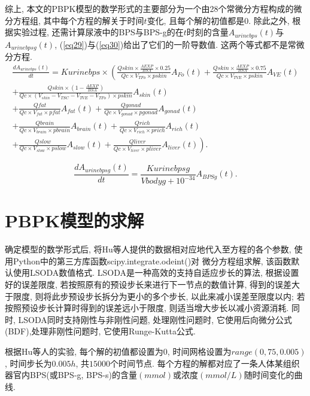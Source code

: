 \documentclass[a4paper,punct=banjiao,twoside]{ctexrep}
\theoremstyle{plain}
\theoremstyle{definition}
\theoremstyle{remark}
\begin{document}
综上, 本文的PBPK模型的数学形式的主要部分为一个由28个常微分方程构成的微分方程组, 其中每个方程的解关于时间$t$变化, 且每个解的初值都是0.
除此之外, 根据实验过程, 还需计算尿液中的BPS与BPS-g的在$t$时刻的含量$A_{urinebps}(t)$与$A_{urinebpsg}(t)$, (\ref{eq29})与(\ref{eq30})给出了它们的一阶导数值.
这两个等式都不是常微分方程.
\begin{multline}\label{eq29}
  \frac{dA_{urinebps}(t)}{dt}=Kurinebps\times \left(\frac{  Qskin \times  \frac{AEXP}{BSA} \times  0.25}{Qc \times  V_{TFo}  \times  pskin} A_{Fo}(t)
  +\frac{  Qskin \times  \frac{AEXP}{BSA} \times  0.75}{Qc \times  V_{TVE}  \times  pskin} A_{VE}(t)\right.\\
  \left.+\frac{  Qskin \times  (1-\frac{AEXP}{BSA})}{Qc \times  (V_{skin}-V_{TSC}-V_{TVE}-V_{TFo}) \times  pskin} A_{skin}(t)\right.\\
  \left.+\frac{  Qfat}{Qc \times  V_{fat}  \times  pfat} A_{fat}(t)
  +\frac{  Qgonad}{Qc \times  V_{gonad}  \times  pgonad} A_{gonad}(t)\right.\\
  \left.+\frac{  Qbrain}{Qc \times  V_{brain} \times  pbrain} A_{brain}(t)
  +\frac{  Qrich}{Qc \times  V_{rich}  \times  prich} A_{rich}(t)\right.\\
  \left.+\frac{  Qslow}{Qc \times  V_{slow}  \times  pslow} A_{slow}(t)
  +\frac{  Qliver}{Qc \times  V_{liver} \times  pliver} A_{liver}(t)\right).
\end{multline}

\begin{equation}\label{eq30}
  \frac{dA_{urinebpsg}(t)}{dt}=\frac{Kurinebpsg}{Vbodyg+10^{-34} } A_{BPSg}(t).
\end{equation}
\section{PBPK模型的求解}
确定模型的数学形式后, 将Hu等人\cite{12}提供的数据相对应地代入至方程的各个参数, 使用Python中的第三方库函数scipy.integrate.odeint()对
微分方程组求解, 该函数默认使用LSODA数值格式. LSODA是一种高效的支持自适应步长的算法\cite{14}, 根据设置好的误差限度, 若按照原有的预设步长来进行下一节点的数值计算, 得到的误差大于限度, 则将此步预设步长拆分为更小的多个步长, 
以此来减小误差至限度以内; 若按照预设步长计算时得到的误差远小于限度, 则适当增大步长以减小资源消耗. 同时, LSODA同时支持刚性与非刚性问题, 处理刚性问题时, 它使用后向微分公式(BDF),处理非刚性问题时, 它使用Runge-Kutta公式.

根据Hu等人\cite{11}的实验, 每个解的初值都设置为0, 时间网格设置为$range(0,75,0.005)$, 时间步长为$0.005h$, 共$15000$个时间节点.
每个方程的解都对应了一条人体某组织器官内BPS(或BPS-g, BPS-s)的含量$(mmol)$或浓度$(mmol/L)$随时间变化的曲线.
\end{document}
